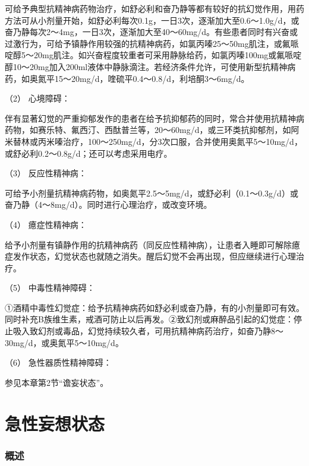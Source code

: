 可给予典型抗精神病药物治疗，如舒必利和奋乃静等都有较好的抗幻觉作用，用药方法可从小剂量开始，如舒必利每次0.1g，一日3次，逐渐加大至0.6～1.0g/d，或奋乃静每次2～4mg，一日3次，逐渐加大至40～60mg/d。有些患者同时有兴奋或过激行为，可给予镇静作用较强的抗精神病药，如氯丙嗪25～50mg肌注，或氟哌啶醇5～20mg肌注。如兴奋程度较重者可采用静脉给药，如氯丙嗪100mg或氟哌啶醇10～20mg加入200ml液体中静脉滴注。若经济条件允许，可使用新型抗精神病药，如奥氮平15～20mg/d，喹硫平0.4～0.8/d，利培酮3～6mg/d。

\hypertarget{text00048.htmlux5cux23CHP1-18-6-3-2-2}{}
（2） 心境障碍：

伴有显著幻觉的严重抑郁发作的患者在给予抗抑郁药的同时，常合并使用抗精神病药物，如赛乐特、氟西汀、西酞普兰等，20～60mg/d，或三环类抗抑郁剂，如阿米替林或丙米嗪治疗，100～250mg/d，分3次口服，合并使用奥氮平5～10mg/d，或舒必利0.2～0.8g/d；还可以考虑采用电疗。

\hypertarget{text00048.htmlux5cux23CHP1-18-6-3-2-3}{}
（3） 反应性精神病：

可给予小剂量抗精神病药物，如奥氮平2.5～5mg/d，或舒必利（0.1～0.3g/d）或奋乃静（4～8mg/d）。同时进行心理治疗，或改变环境。

\hypertarget{text00048.htmlux5cux23CHP1-18-6-3-2-4}{}
（4） 癔症性精神病：

给予小剂量有镇静作用的抗精神病药（同反应性精神病），让患者入睡即可解除癔症发作状态，幻觉状态也就随之消失。醒后幻觉不会再出现，但应继续进行心理治疗。

\hypertarget{text00048.htmlux5cux23CHP1-18-6-3-2-5}{}
（5） 中毒性精神障碍：

①酒精中毒性幻觉症：给予抗精神病药如舒必利或奋乃静，有的小剂量即可有效。同时补充B族维生素，戒酒可防止以后再发。②致幻剂或麻醉品引起的幻觉症：停止吸入致幻剂或毒品，幻觉持续较久者，可用抗精神病药治疗，如奋乃静8～30mg/d，或奥氮平5～10mg/d。

\hypertarget{text00048.htmlux5cux23CHP1-18-6-3-2-6}{}
（6） 急性器质性精神障碍：

参见本章第2节“谵妄状态”。

\protect\hypertarget{text00049.html}{}{}

\section{急性妄想状态}

\subsubsection{概述}

